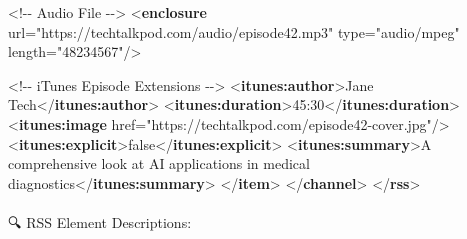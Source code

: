 \documentclass[
  letterpaper,
  DIV=11,
  numbers=noendperiod]{scrartcl}
\makeatletter
\let\oldparagraph\paragraph
\renewcommand{\paragraph}{
    \@ifstar
      \xxxParagraphStar
      \xxxParagraphNoStar
  }
\newcommand{\xxxParagraphStar}[1]{\oldparagraph*{#1}\mbox{}}
\newcommand{\xxxParagraphNoStar}[1]{\oldparagraph{#1}\mbox{}}
\newenvironment{Shaded}{\begin{snugshade}}{\end{snugshade}}
\newcommand{\CommentTok}[1]{\textcolor[rgb]{0.37,0.37,0.37}{#1}}
\newcommand{\KeywordTok}[1]{\textcolor[rgb]{0.00,0.23,0.31}{\textbf{#1}}}
\newcommand{\NormalTok}[1]{\textcolor[rgb]{0.00,0.23,0.31}{#1}}
\newcommand{\OtherTok}[1]{\textcolor[rgb]{0.00,0.23,0.31}{#1}}
\newcommand{\StringTok}[1]{\textcolor[rgb]{0.13,0.47,0.30}{#1}}
\makeatother
\begin{document}
\begin{Shaded}
\begin{Highlighting}[]
      \CommentTok{\textless{}!{-}{-} Audio File {-}{-}\textgreater{}}
\NormalTok{      \textless{}}\KeywordTok{enclosure}\OtherTok{ url=}\StringTok{"https://techtalkpod.com/audio/episode42.mp3"} 
\OtherTok{                 type=}\StringTok{"audio/mpeg"} 
\OtherTok{                 length=}\StringTok{"48234567"}\NormalTok{/\textgreater{}}
      
      \CommentTok{\textless{}!{-}{-} iTunes Episode Extensions {-}{-}\textgreater{}}
\NormalTok{      \textless{}}\KeywordTok{itunes:author}\NormalTok{\textgreater{}Jane Tech\textless{}/}\KeywordTok{itunes:author}\NormalTok{\textgreater{}}
\NormalTok{      \textless{}}\KeywordTok{itunes:duration}\NormalTok{\textgreater{}45:30\textless{}/}\KeywordTok{itunes:duration}\NormalTok{\textgreater{}}
\NormalTok{      \textless{}}\KeywordTok{itunes:image}\OtherTok{ href=}\StringTok{"https://techtalkpod.com/episode42{-}cover.jpg"}\NormalTok{/\textgreater{}}
\NormalTok{      \textless{}}\KeywordTok{itunes:explicit}\NormalTok{\textgreater{}false\textless{}/}\KeywordTok{itunes:explicit}\NormalTok{\textgreater{}}
\NormalTok{      \textless{}}\KeywordTok{itunes:summary}\NormalTok{\textgreater{}A comprehensive look at AI applications in medical diagnostics\textless{}/}\KeywordTok{itunes:summary}\NormalTok{\textgreater{}}
\NormalTok{    \textless{}/}\KeywordTok{item}\NormalTok{\textgreater{}}
\NormalTok{  \textless{}/}\KeywordTok{channel}\NormalTok{\textgreater{}}
\NormalTok{\textless{}/}\KeywordTok{rss}\NormalTok{\textgreater{}}
\end{Highlighting}
\end{Shaded}

\paragraph{🔍 RSS Element Descriptions:}\label{rss-element-descriptions}
\end{document}
